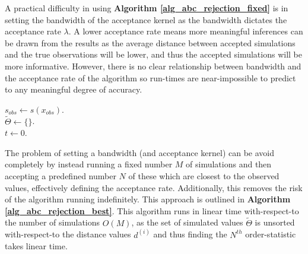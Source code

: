 \documentclass[11pt,a4paper]{article}
\theoremstyle{break}
\begin{document}
  \par A practical difficulty in using \textbf{Algorithm \ref{alg_abc_rejection_fixed}} is in setting the bandwidth of the acceptance kernel as the bandwidth dictates the acceptance rate $\lambda$. A lower acceptance rate means more meaningful inferences can be drawn from the results as the average distance between accepted simulations and the true observations will be lower, and thus the accepted simulations will be more informative. However, there is no clear relationship between bandwidth and the acceptance rate of the algorithm so run-times are near-impossible to predict to any meaningful degree of accuracy.

  \begin{box_algorithm}\label{alg_abc_rejection_best}
    \begin{algorithm}[H]
      $s_{obs}\leftarrow s(x_{obs})$.\\
      $\tilde\Theta\leftarrow\{\}$.\\
      $t\leftarrow0$.\\
    \end{algorithm}
  \end{box_algorithm}

  \par The problem of setting a bandwidth (and acceptance kernel) can be avoid completely by instead running a fixed number $M$ of simulations and then accepting a predefined number $N$ of these which are closest to the observed values, effectively defining the acceptance rate. Additionally, this removes the risk of the algorithm running indefinitely. This approach is outlined in \textbf{Algorithm \ref{alg_abc_rejection_best}}. This algorithm runs in linear time with-respect-to the number of simulations $O(M)$, as the set of simulated values $\tilde\Theta$ is unsorted with-respect-to the distance values $d^{(i)}$ and thus finding the $N^{th}$ order-statistic takes linear time.
\end{document}
